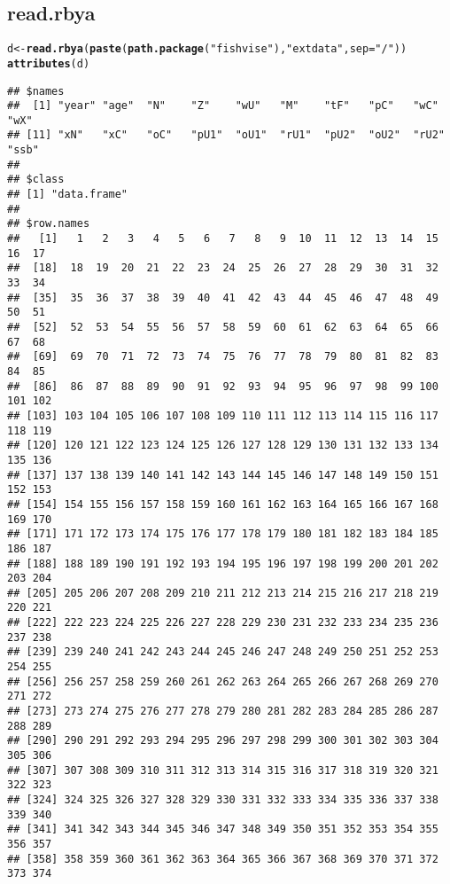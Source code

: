 \documentclass[a4paper]{article}\usepackage{graphicx, color}
\makeatletter
\newcommand{\hlfunctioncall}[1]{\textcolor[rgb]{0.501960784313725,0,0.329411764705882}{\textbf{#1}}}%
\newcommand{\hlstring}[1]{\textcolor[rgb]{0.6,0.6,1}{#1}}%
\newenvironment{kframe}{%
 \def\at@end@of@kframe{}%
 \ifinner\ifhmode%
  \def\at@end@of@kframe{\end{minipage}}%
  \begin{minipage}{\columnwidth}%
 \fi\fi%
 \def\FrameCommand##1{\hskip\@totalleftmargin \hskip-\fboxsep
 \colorbox{shadecolor}{##1}\hskip-\fboxsep
     \hskip-\linewidth \hskip-\@totalleftmargin \hskip\columnwidth}%
 \MakeFramed {\advance\hsize-\width
   \@totalleftmargin\z@ \linewidth\hsize
   \@setminipage}}%
 {\par\unskip\endMakeFramed%
 \at@end@of@kframe}
\newenvironment{knitrout}{}{} %
\makeatother
\begin{document}
\subsection*{read.rbya}
\begin{knitrout}
\color{fgcolor}\begin{kframe}
\begin{alltt}
d <- \hlfunctioncall{read.rbya}(\hlfunctioncall{paste}(\hlfunctioncall{path.package}(\hlstring{"fishvise"}), \hlstring{"extdata"}, sep = \hlstring{"/"}))
\hlfunctioncall{attributes}(d)
\end{alltt}
\begin{verbatim}
## $names
##  [1] "year" "age"  "N"    "Z"    "wU"   "M"    "tF"   "pC"   "wC"   "wX"  
## [11] "xN"   "xC"   "oC"   "pU1"  "oU1"  "rU1"  "pU2"  "oU2"  "rU2"  "ssb" 
## 
## $class
## [1] "data.frame"
## 
## $row.names
##   [1]   1   2   3   4   5   6   7   8   9  10  11  12  13  14  15  16  17
##  [18]  18  19  20  21  22  23  24  25  26  27  28  29  30  31  32  33  34
##  [35]  35  36  37  38  39  40  41  42  43  44  45  46  47  48  49  50  51
##  [52]  52  53  54  55  56  57  58  59  60  61  62  63  64  65  66  67  68
##  [69]  69  70  71  72  73  74  75  76  77  78  79  80  81  82  83  84  85
##  [86]  86  87  88  89  90  91  92  93  94  95  96  97  98  99 100 101 102
## [103] 103 104 105 106 107 108 109 110 111 112 113 114 115 116 117 118 119
## [120] 120 121 122 123 124 125 126 127 128 129 130 131 132 133 134 135 136
## [137] 137 138 139 140 141 142 143 144 145 146 147 148 149 150 151 152 153
## [154] 154 155 156 157 158 159 160 161 162 163 164 165 166 167 168 169 170
## [171] 171 172 173 174 175 176 177 178 179 180 181 182 183 184 185 186 187
## [188] 188 189 190 191 192 193 194 195 196 197 198 199 200 201 202 203 204
## [205] 205 206 207 208 209 210 211 212 213 214 215 216 217 218 219 220 221
## [222] 222 223 224 225 226 227 228 229 230 231 232 233 234 235 236 237 238
## [239] 239 240 241 242 243 244 245 246 247 248 249 250 251 252 253 254 255
## [256] 256 257 258 259 260 261 262 263 264 265 266 267 268 269 270 271 272
## [273] 273 274 275 276 277 278 279 280 281 282 283 284 285 286 287 288 289
## [290] 290 291 292 293 294 295 296 297 298 299 300 301 302 303 304 305 306
## [307] 307 308 309 310 311 312 313 314 315 316 317 318 319 320 321 322 323
## [324] 324 325 326 327 328 329 330 331 332 333 334 335 336 337 338 339 340
## [341] 341 342 343 344 345 346 347 348 349 350 351 352 353 354 355 356 357
## [358] 358 359 360 361 362 363 364 365 366 367 368 369 370 371 372 373 374

\end{verbatim}
\end{kframe}
\end{knitrout}
\end{document}
